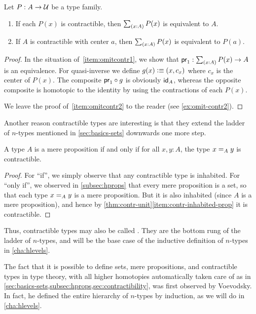 \begin{lem}\label{thm:omit-contr}
  Let $P:A\to\type$ be a type family.
  \begin{enumerate}
  \item If each $P(x)$ is contractible, then $\sm{x:A} P(x)$ is equivalent to $A$.\label{item:omitcontr1}
  \item If $A$ is contractible with center $a$, then $\sm{x:A} P(x)$ is equivalent to $P(a)$.\label{item:omitcontr2}
  \end{enumerate}
\end{lem}
\begin{proof}
  In the situation of~\ref{item:omitcontr1}, we show that $\proj1:\sm{x:A} P(x) \to A$ is an equivalence.
  For quasi-inverse we define $g(x)\defeq (x,c_x)$ where $c_x$ is the center of $P(x)$.
  The composite $\proj1 \circ g$ is obviously $\idfunc[A]$, whereas the opposite composite is homotopic to the identity by using the contractions of each $P(x)$.

  We leave the proof of~\ref{item:omitcontr2} to the reader (see \autoref{ex:omit-contr2}).
\end{proof}

Another reason contractible types are interesting is that they extend the ladder of $n$-types mentioned in \autoref{sec:basics-sets} downwards one more step.

\begin{lem}\label{thm:prop-minusonetype}
  A type $A$ is a mere proposition if and only if for all $x,y:A$, the type $\id[A]xy$ is contractible.
\end{lem}
\begin{proof}
  For ``if'', we simply observe that any contractible type is inhabited.
  For ``only if'', we observed in \autoref{subsec:hprops} that every mere proposition is a set, so that each type $\id[A]xy$ is a mere proposition.
  But it is also inhabited (since $A$ is a mere proposition), and hence by \autoref{thm:contr-unit}\ref{item:contr-inhabited-prop} it is contractible.
\end{proof}

Thus, contractible types may also be called .
They are the bottom rung of the ladder of $n$-types, and will be the base case of the inductive definition of $n$-types in \autoref{cha:hlevels}.

\sectionNotes

The fact that it is possible to define sets, mere propositions, and contractible types in type theory, with all higher homotopies automatically taken care of as in \autoref{sec:basics-sets,subsec:hprops,sec:contractibility}, was first observed by Voevodsky.
In fact, he defined the entire hierarchy of $n$-types by induction, as we will do in \autoref{cha:hlevels}.

